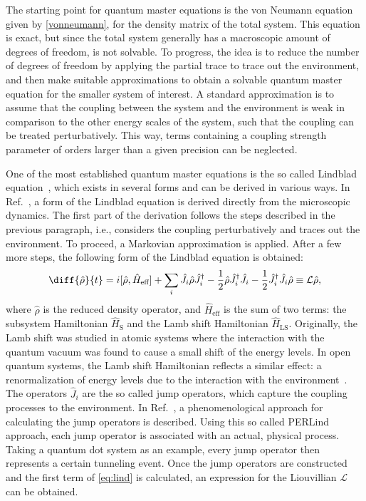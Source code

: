 \documentclass[../main.tex]{subfiles}
\begin{document}
The starting point for quantum master equations is the von Neumann equation given by \cref{vonneumann}, for the density matrix of the total system. This equation is exact, but since the total system generally has a macroscopic amount of degrees of freedom, is not solvable. To progress, the idea is to reduce the number of degrees of freedom by applying the partial trace to trace out the environment, and then make suitable approximations to obtain a solvable quantum master equation for the smaller system of interest. A standard approximation is to assume that the coupling between the system and the environment is weak in comparison to the other energy scales of the system, such that the coupling can be treated perturbatively. This way, terms containing a coupling strength parameter of orders larger than a given precision can be neglected.

One of the most established quantum master equations is the so called Lindblad equation~\cite{lindorigin}, which exists in several forms and can be derived in various ways. In Ref.~\cite{lindblad}, a form of the Lindblad equation is derived directly from the microscopic dynamics. The first part of the derivation follows the steps described in the previous paragraph, i.e., considers the coupling perturbatively and traces out the environment. To proceed, a Markovian approximation is applied. After a few more steps, the following form of the Lindblad equation is obtained:
\begin{equation}\label{eq:lind}
    \diff{\hat\rho}{t} = i[\hat\rho, \hat H_\text{eff}] + \sum_i \hat J_i\hat\rho\hat J_i^\dag - \frac{1}{2}\hat\rho\hat J_i^\dag\hat J_i - \frac{1}{2}\hat J_i^\dag\hat J_i \hat\rho \equiv \mathcal{L}\hat\rho,
\end{equation}
where $\hat \rho$ is the reduced density operator, and $\hat H_\text{eff}$ is the sum of two terms: the subsystem Hamiltonian $\hat H_\text{S}$ and the Lamb shift Hamiltonian $\hat H_\text{LS}$. Originally, the Lamb shift was studied in atomic systems where the interaction with the quantum vacuum was found to cause a small shift of the energy levels. In open quantum systems, the Lamb shift Hamiltonian reflects a similar effect: a renormalization of energy levels due to the interaction with the environment~\cite{lindblad}. The operators $\hat J_i$ are the so called jump operators, which capture the coupling processes to the environment. In Ref.~\cite{perlind}, a phenomenological approach for calculating the jump operators is described. Using this so called PERLind approach, each jump operator is associated with an actual, physical process. Taking a quantum dot system as an example, every jump operator then represents a certain tunneling event. Once the jump operators are constructed and the first term of \cref{eq:lind} is calculated, an expression for the Liouvillian $\mathcal{L}$ can be obtained. 
\end{document}
